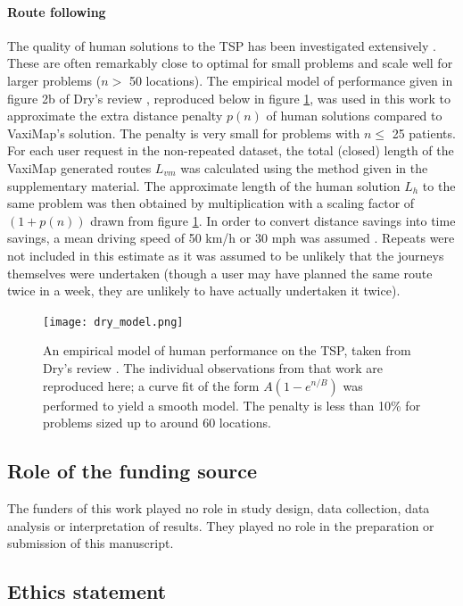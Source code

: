\documentclass[review]{elsarticle}
\def\vm{VaxiMap}
\begin{document}
\paragraph{Route following}
The quality of human solutions to the TSP has been investigated extensively \cite{Macgregor1996, MacGregor2011, Vickers2001, MacGregor1999a}. These are often remarkably close to optimal for small problems and scale well  for larger problems ($n > $ 50 locations). The empirical model of performance given in figure 2b of Dry's review \cite{Dry2006}, reproduced below in figure \ref{dry_model}, was used in this work to approximate the extra distance penalty $p(n)$ of human solutions compared to \vm{}'s solution. The penalty is very small for problems with $n \leq$ 25 patients. For each user request in the non-repeated dataset, the total (closed) length of the \vm{} generated routes $L_{vm}$ was calculated using the method given in the supplementary material. The approximate length of the human solution $L_h$ to the same problem was then obtained by multiplication with a scaling factor of $(1 + p(n))$ drawn from figure \ref{dry_model}. In order to convert distance savings into time savings, a mean driving speed of 50 km/h or 30 mph was assumed \cite{Balendra2020}. Repeats were not included in this estimate as it was assumed to be unlikely that the journeys themselves were undertaken (though a user may have planned the same route twice in a week, they are unlikely to have actually undertaken it twice).  

\begin{figure}[H]
\centering
\texttt{[image: dry\_model.png]}
\caption{An empirical model of human performance on the TSP, taken from Dry's review \cite{Dry2006}. The individual observations from that work are reproduced here; a curve fit of the form $A(1 - e^{n/B})$ was performed to yield a smooth model. The penalty is less than 10\% for problems sized up to around 60 locations.}
\label{dry_model}
\end{figure}

\subsection{Role of the funding source}

The funders of this work played no role in study design, data collection, data analysis or interpretation of results. They played no role in the preparation or submission of this manuscript. 

\subsection{Ethics statement}
\end{document}
